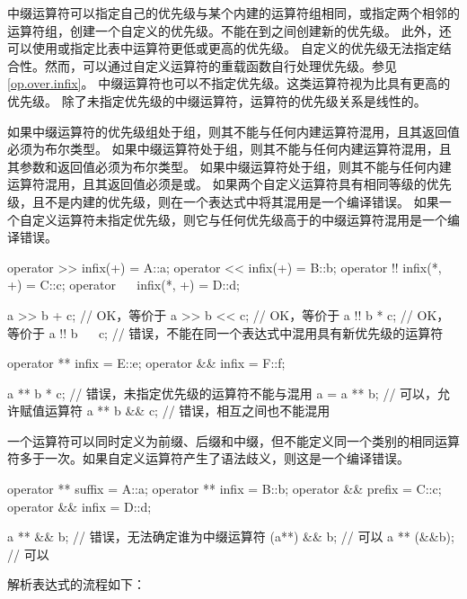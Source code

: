 \pnum
中缀运算符可以指定自己的优先级与某个内建的运算符组相同，或指定两个相邻的运算符组，创建一个自定义的优先级。不能在\tcode{==}到\tcode{=}之间创建新的优先级。
此外，还可以使用\tcode{(_, *)}或\tcode{(=, _)}指定比表中运算符更低或更高的优先级。
\enternote 自定义的优先级无法指定结合性。然而，可以通过自定义运算符的重载函数自行处理优先级。参见\ref{op.over.infix}。\exitnote
中缀运算符也可以不指定优先级。这类运算符视为比\tcode{==}具有更高的优先级。
除了未指定优先级的中缀运算符，运算符的优先级关系是线性的。

\pnum
如果中缀运算符的优先级组处于\tcode{==}组，则其不能与任何内建运算符混用，且其返回值必须为布尔类型。
如果中缀运算符处于\tcode{\&}组，则其不能与任何内建运算符混用，且其参数和返回值必须为布尔类型。
如果中缀运算符处于\tcode{=}组，则其不能与任何内建运算符混用，且其返回值必须是或。
如果两个自定义运算符具有相同等级的优先级，且不是内建的优先级，则在一个表达式中将其混用是一个编译错误。
如果一个自定义运算符未指定优先级，则它与任何优先级高于\tcode{==}的中缀运算符混用是一个编译错误。

\enterexample
\begin{codeblock}
operator >> infix(+) = A::a;
operator << infix(+) = B::b;
operator !! infix(*, +) = C::c;
operator ~~ infix(*, +) = D::d;

a >> b + c; // OK，等价于
a >> b << c; // OK，等价于
a !! b * c; // OK，等价于
a !! b ~~ c; // 错误，不能在同一个表达式中混用具有新优先级的运算符

operator ** infix = E::e;
operator && infix = F::f;

a ** b * c; // 错误，未指定优先级的运算符不能与\tcode{*}混用
a = a ** b; // 可以，允许赋值运算符
a ** b && c; // 错误，相互之间也不能混用
\end{codeblock}
\exitexample

\pnum
一个运算符可以同时定义为前缀、后缀和中缀，但不能定义同一个类别的相同运算符多于一次。如果自定义运算符产生了语法歧义，则这是一个编译错误。

\enterexample
\begin{codeblock}
operator ** suffix = A::a;
operator ** infix = B::b;
operator && prefix = C::c;
operator && infix = D::d;

a ** && b; // 错误，无法确定谁为中缀运算符
(a**) && b; // 可以
a ** (&&b); // 可以
\end{codeblock}
\exitexample

\pnum
解析表达式的流程如下：

